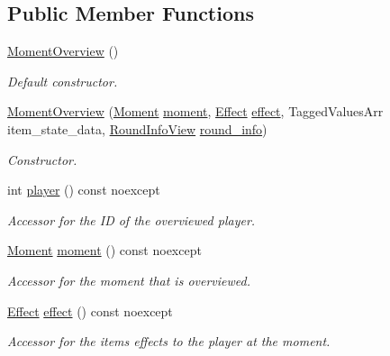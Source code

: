 \subsection*{Public Member Functions}
\begin{DoxyCompactItemize}
\item 
\hyperlink{classexternal_1_1_moment_overview_aabe55b10c977be45ba2574c606676c87}{Moment\+Overview} ()
\begin{DoxyCompactList}\small\item\em Default constructor. \end{DoxyCompactList}\item 
\hyperlink{classexternal_1_1_moment_overview_a66f1625110407c8fe6fd9e07fca75ff3}{Moment\+Overview} (\hyperlink{classtimeplane_1_1_moment}{Moment} \hyperlink{classexternal_1_1_moment_overview_a6aaebaf6107f40bfb22a15f82c92e131}{moment}, \hyperlink{classitem_1_1_effect}{Effect} \hyperlink{classexternal_1_1_moment_overview_abeb27fa11c351eea2c90679842895497}{effect}, Tagged\+Values\+Arr item\+\_\+state\+\_\+data, \hyperlink{classroundinfo_1_1_round_info_view}{Round\+Info\+View} \hyperlink{classexternal_1_1_moment_overview_a186a205fd74b30b627b82bf837b78f79}{round\+\_\+info})
\begin{DoxyCompactList}\small\item\em Constructor. \end{DoxyCompactList}\item 
int \hyperlink{classexternal_1_1_moment_overview_afb04d3b50661c06510b77e73d66e70ac}{player} () const noexcept
\begin{DoxyCompactList}\small\item\em Accessor for the ID of the overviewed player. \end{DoxyCompactList}\item 
\hyperlink{classtimeplane_1_1_moment}{Moment} \hyperlink{classexternal_1_1_moment_overview_a6aaebaf6107f40bfb22a15f82c92e131}{moment} () const noexcept
\begin{DoxyCompactList}\small\item\em Accessor for the moment that is overviewed. \end{DoxyCompactList}\item 
\hyperlink{classitem_1_1_effect}{Effect} \hyperlink{classexternal_1_1_moment_overview_abeb27fa11c351eea2c90679842895497}{effect} () const noexcept
\begin{DoxyCompactList}\small\item\em Accessor for the items\textquotesingle{} effects to the player at the moment. \end{DoxyCompactList}\item 

\end{DoxyCompactItemize}
